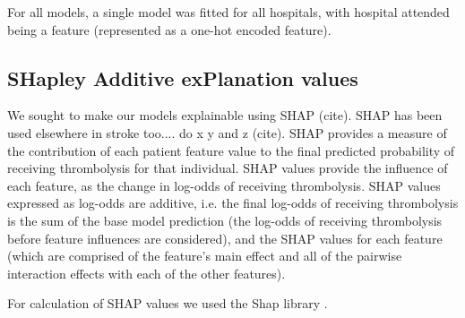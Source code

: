 For all models, a single model was fitted for all hospitals, with hospital attended being a feature (represented as a one-hot encoded feature).

\iffalse
\subsection{Characteristics of the most thrombolysable patient (at each hospital)}
We identified the patient at each hospital that the model predicted had the highest probability of receiving thrombolysis (using the combined test-set results from the \emph{k-fold model}), and compared the feature values of those 132 patients to:
\begin{itemize}
\item All patients
\item All patients who had received thrombolysis
\item All patients who had not received thrombolysis
\end{itemize}
\fi

\subsection{SHapley Additive exPlanation values}

We sought to make our models explainable using SHAP (cite). SHAP has been used elsewhere in stroke too.... do x y and z (cite). SHAP provides a measure of the contribution of each patient feature value to the final predicted probability of receiving thrombolysis for that individual. SHAP values provide the influence of each feature, as the change in log-odds of receiving thrombolysis. SHAP values expressed as log-odds are additive, i.e. the final log-odds of receiving thrombolysis is the sum of the base model prediction (the log-odds of receiving thrombolysis before feature influences are considered), and the SHAP values for each feature (which are comprised of the feature's main effect and all of the pairwise interaction effects with each of the other features). 

For calculation of SHAP values we used the Shap library \cite{lundberg_unified_2017}.


